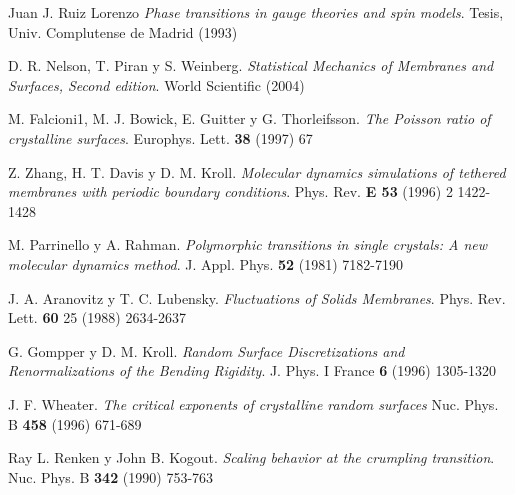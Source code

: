 \begin{thebibliography}{99}
 Juan J. Ruiz Lorenzo
    \textit{Phase transitions in gauge theories and spin models}.
    Tesis, Univ. Complutense de Madrid (1993) 

  D. R. Nelson, T. Piran y S. Weinberg. 
  \textit{Statistical Mechanics of Membranes and Surfaces, Second edition}. 
  World Scientific (2004)

 
 M. Falcioni1, M. J. Bowick, E. Guitter y
  G. Thorleifsson.
  \textit{The Poisson ratio of crystalline surfaces}. 
  Europhys. Lett. \textbf{38} (1997) 67

 Z. Zhang, H. T. Davis y D. M. Kroll.
\textit{Molecular dynamics simulations of tethered membranes with periodic
  boundary conditions}.
 Phys. Rev. \textbf{E 53} (1996) 2 1422-1428

 M. Parrinello y A. Rahman.
\textit{Polymorphic transitions in single crystals: A new molecular dynamics
  method}.
J. Appl. Phys. \textbf{52} (1981) 7182-7190  

 J. A. Aranovitz y T. C. Lubensky. 
\textit{Fluctuations of Solids Membranes}.
Phys. Rev. Lett. \textbf{60} 25 (1988) 2634-2637

G. Gompper y D. M. Kroll.
\textit{Random Surface Discretizations and Renormalizations of the Bending
  Rigidity}.
J. Phys. I France \textbf{6} (1996) 1305-1320

J. F. Wheater.
\textit{The critical exponents of crystalline random surfaces}
Nuc. Phys. B \textbf{458} (1996) 671-689

 Ray L. Renken y John B. Kogout.
\textit{Scaling behavior at the crumpling transition}.
Nuc. Phys. B \textbf{342} (1990) 753-763
\end{thebibliography}

